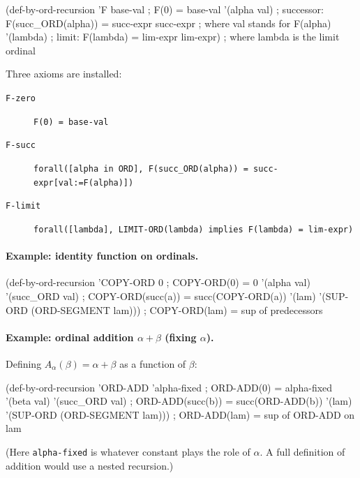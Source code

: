 \documentclass{amsbook}[openany]
\theoremstyle{definition}
\theoremstyle{remark}
\theoremstyle{remark}
\begin{document}
\begin{VNBcode}
(def-by-ord-recursion 'F
  base-val            ; F(0) = base-val
  '(alpha val)        ; successor: F(succ_ORD(alpha)) = succ-expr
  succ-expr           ;   where val stands for F(alpha)
  '(lambda)           ; limit: F(lambda) = lim-expr
  lim-expr)           ;   where lambda is the limit ordinal
\end{VNBcode}

Three axioms are installed:
\begin{description}
\item[\texttt{F-zero}] \texttt{F(0) = base-val}
\item[\texttt{F-succ}] \texttt{forall([alpha in ORD], F(succ\_ORD(alpha)) = succ-expr[val:=F(alpha)])}
\item[\texttt{F-limit}] \texttt{forall([lambda], LIMIT-ORD(lambda) implies F(lambda) = lim-expr)}
\end{description}

\paragraph{Example: identity function on ordinals.}

\begin{VNBcode}
(def-by-ord-recursion 'COPY-ORD
  0                                         ; COPY-ORD(0) = 0
  '(alpha val) '(succ_ORD val)              ; COPY-ORD(succ(a)) = succ(COPY-ORD(a))
  '(lam) '(SUP-ORD (ORD-SEGMENT lam)))      ; COPY-ORD(lam) = sup of predecessors
\end{VNBcode}

\paragraph{Example: ordinal addition $\alpha + \beta$ (fixing $\alpha$).}

Defining $A_\alpha(\beta) = \alpha + \beta$ as a function of $\beta$:
\begin{VNBcode}
(def-by-ord-recursion 'ORD-ADD
  'alpha-fixed                              ; ORD-ADD(0) = alpha-fixed
  '(beta val) '(succ_ORD val)              ; ORD-ADD(succ(b)) = succ(ORD-ADD(b))
  '(lam) '(SUP-ORD (ORD-SEGMENT lam)))     ; ORD-ADD(lam) = sup of ORD-ADD on lam
\end{VNBcode}

(Here \texttt{alpha-fixed} is whatever constant plays the role of
$\alpha$.  A full definition of addition would use a nested recursion.)
\end{document}
